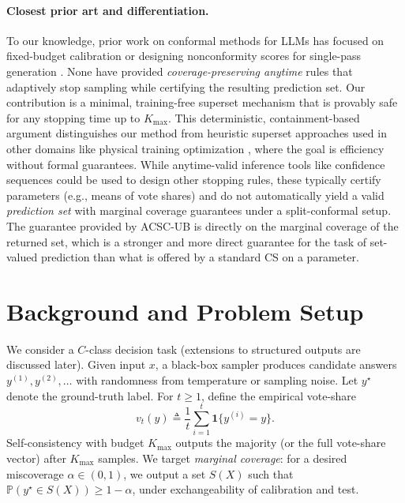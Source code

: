 \documentclass[11pt]{article}
\begin{document}
\paragraph{Closest prior art and differentiation.}
To our knowledge, prior work on conformal methods for LLMs has focused on fixed-budget calibration or designing nonconformity scores for single-pass generation \cite{kumar2023conformal}. None have provided \emph{coverage-preserving anytime} rules that adaptively stop sampling while certifying the resulting prediction set. Our contribution is a minimal, training-free superset mechanism that is provably safe for any stopping time up to $K_{\max}$. This deterministic, containment-based argument distinguishes our method from heuristic superset approaches used in other domains like physical training optimization \cite{weakley2019superset}, where the goal is efficiency without formal guarantees. While anytime-valid inference tools like confidence sequences could be used to design other stopping rules, these typically certify parameters (e.g., means of vote shares) and do not automatically yield a valid \emph{prediction set} with marginal coverage guarantees under a split-conformal setup. The guarantee provided by ACSC-UB is directly on the marginal coverage of the returned set, which is a stronger and more direct guarantee for the task of set-valued prediction than what is offered by a standard CS on a parameter.

\section{Background and Problem Setup}
We consider a $C$-class decision task (extensions to structured outputs are discussed later).
Given input $x$, a black-box sampler produces candidate answers $y^{(1)}, y^{(2)}, \dots$ with randomness from temperature or sampling noise. Let $y^\star$ denote the ground-truth label. For $t \ge 1$, define the empirical vote-share
\[
v_t(y) \triangleq \frac{1}{t}\sum_{i=1}^t \mathbf{1}\{y^{(i)} = y\}.
\]
Self-consistency with budget $K_{\max}$ outputs the majority (or the full vote-share vector) after $K_{\max}$ samples. We target \emph{marginal coverage}: for a desired miscoverage $\alpha\in(0,1)$, we output a set $S(X)$ such that $\mathbb{P}(y^\star\in S(X))\ge 1-\alpha$, under exchangeability of calibration and test.
\end{document}
